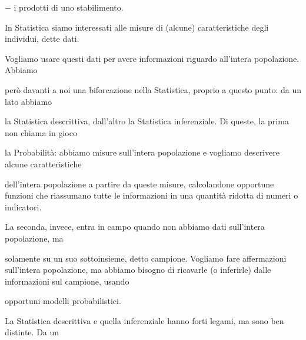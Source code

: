 \documentclass[a4paper,portrait,12pt]{article}
\begin{document}
\begin{flushleft}
$-$ i prodotti di uno stabilimento.
\end{flushleft}


\begin{flushleft}
In Statistica siamo interessati alle misure di (alcune) caratteristiche degli individui, dette dati.
\end{flushleft}


\begin{flushleft}
Vogliamo usare questi dati per avere informazioni riguardo all'intera popolazione. Abbiamo
\end{flushleft}


\begin{flushleft}
per\`{o} davanti a noi una biforcazione nella Statistica, proprio a questo punto: da un lato abbiamo
\end{flushleft}


\begin{flushleft}
la Statistica descrittiva, dall'altro la Statistica inferenziale. Di queste, la prima non chiama in gioco
\end{flushleft}


\begin{flushleft}
la Probabilit\`{a}: abbiamo misure sull'intera popolazione e vogliamo descrivere alcune caratteristiche
\end{flushleft}


\begin{flushleft}
dell'intera popolazione a partire da queste misure, calcolandone opportune funzioni che riassumano tutte le informazioni in una quantit\`{a} ridotta di numeri o indicatori.
\end{flushleft}


\begin{flushleft}
La seconda, invece, entra in campo quando non abbiamo dati sull'intera popolazione, ma
\end{flushleft}


\begin{flushleft}
solamente su un suo sottoinsieme, detto campione. Vogliamo fare affermazioni sull'intera popolazione, ma abbiamo bisogno di ricavarle (o inferirle) dalle informazioni sul campione, usando
\end{flushleft}


\begin{flushleft}
opportuni modelli probabilistici.
\end{flushleft}


\begin{flushleft}
La Statistica descrittiva e quella inferenziale hanno forti legami, ma sono ben distinte. Da un
\end{flushleft}
\end{document}
